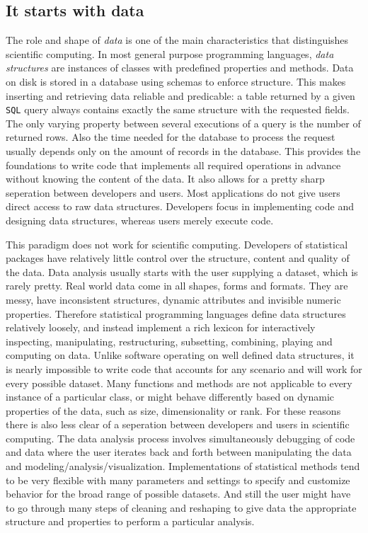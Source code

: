 \documentclass{article}
\newcommand{\SQL}{\texttt{SQL}\xspace}
\begin{document}
\subsection{It starts with data}

The role and shape of \emph{data} is one of the main characteristics that distinguishes scientific computing. In most general purpose programming languages, \emph{data structures} are instances of classes with predefined properties and methods. Data on disk is stored in a database using schemas to enforce structure. This makes inserting and retrieving data reliable and predicable: a table returned by a given \SQL query always contains exactly the same structure with the requested fields. The only varying property between several executions of a query is the number of returned rows. Also the time needed for the database to process the request usually depends only on the amount of records in the database. This provides the foundations to write code that implements all required operations in advance without knowing the content of the data. It also allows for a pretty sharp seperation between developers and users. Most applications do not give users direct access to raw data structures. Developers focus in implementing code and designing data structures, whereas users merely execute code.

This paradigm does not work for scientific computing. Developers of statistical packages have relatively little control over the structure, content and quality of the data. Data analysis usually starts with the user supplying a dataset, which is rarely pretty. Real world data come in all shapes, forms and formats. They are messy, have inconsistent structures, dynamic attributes and invisible numeric properties. Therefore statistical programming languages define data structures relatively loosely, and instead implement a rich lexicon for interactively inspecting, manipulating, restructuring, subsetting, combining, playing and computing on data. Unlike software operating on well defined data structures, it is nearly impossible to write code that accounts for any scenario and will work for every possible dataset. Many functions and methods are not applicable to every instance of a particular class, or might behave differently based on dynamic properties of the data, such as size, dimensionality or rank. For these reasons there is also less clear of a seperation between developers and users in scientific computing. The data analysis process involves simultaneously debugging of code and data where the user iterates back and forth between manipulating the data and modeling/analysis/visualization. Implementations of statistical methods tend to be very flexible with many parameters and settings to specify and customize behavior for the broad range of possible datasets. And still the user might have to go through many steps of cleaning and reshaping to give data the appropriate structure and properties to perform a particular analysis. 
\end{document}
